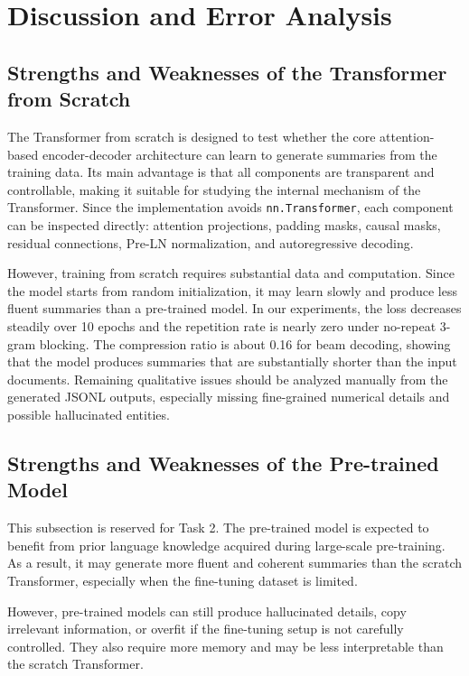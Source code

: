 \documentclass[conference]{IEEEtran}
\begin{document}
\section{Discussion and Error Analysis}

\subsection{Strengths and Weaknesses of the Transformer from Scratch}
The Transformer from scratch is designed to test whether the core attention-based encoder-decoder architecture can learn to generate summaries from the training data. Its main advantage is that all components are transparent and controllable, making it suitable for studying the internal mechanism of the Transformer. Since the implementation avoids \texttt{nn.Transformer}, each component can be inspected directly: attention projections, padding masks, causal masks, residual connections, Pre-LN normalization, and autoregressive decoding.

However, training from scratch requires substantial data and computation. Since the model starts from random initialization, it may learn slowly and produce less fluent summaries than a pre-trained model. In our experiments, the loss decreases steadily over 10 epochs and the repetition rate is nearly zero under no-repeat 3-gram blocking. The compression ratio is about 0.16 for beam decoding, showing that the model produces summaries that are substantially shorter than the input documents. Remaining qualitative issues should be analyzed manually from the generated JSONL outputs, especially missing fine-grained numerical details and possible hallucinated entities.

\subsection{Strengths and Weaknesses of the Pre-trained Model}
This subsection is reserved for Task 2. The pre-trained model is expected to benefit from prior language knowledge acquired during large-scale pre-training. As a result, it may generate more fluent and coherent summaries than the scratch Transformer, especially when the fine-tuning dataset is limited.

However, pre-trained models can still produce hallucinated details, copy irrelevant information, or overfit if the fine-tuning setup is not carefully controlled. They also require more memory and may be less interpretable than the scratch Transformer.
\end{document}
